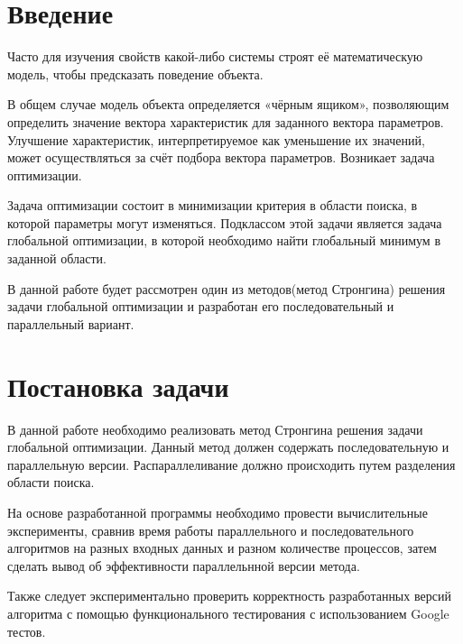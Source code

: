 \documentclass{report}
\begin{document}
	\setcounter{page}{2}
	
	\tableofcontents
	\newpage
	
	\section*{Введение}
	Часто для изучения свойств какой-либо системы строят её математическую модель, чтобы предсказать поведение объекта.
	\par
	В общем случае модель объекта определяется «чёрным ящиком», позволяющим определить значение вектора характеристик для заданного вектора параметров. Улучшение характеристик, интерпретируемое как уменьшение их значений, может осуществляться за счёт подбора вектора параметров. Возникает задача оптимизации.
	\par
	Задача оптимизации состоит в минимизации критерия в области поиска, в которой параметры могут изменяться. Подклассом этой задачи является задача глобальной оптимизации, в которой необходимо найти глобальный минимум в заданной области.
	\par
	В данной работе будет рассмотрен один из методов(метод Стронгина) решения задачи глобальной оптимизации и разработан его последовательный и параллельный вариант.
	
	\newpage
	
	\section*{Постановка задачи}
	В данной работе необходимо реализовать метод Стронгина решения задачи глобальной оптимизации. Данный метод должен содержать последовательную и параллельную версии. Распараллеливание должно происходить путем разделения области поиска.
	\par
	На основе разработанной программы необходимо провести вычислительные эксперименты, сравнив время работы параллельного и последовательного алгоритмов на разных входных данных и разном количестве процессов, затем сделать вывод об эффективности параллельнной версии метода.
	\par
	Также следует экспериментально проверить корректность разработанных версий алгоритма с помощью функционального тестирования с использованием Google тестов.
	\newpage
	
\end{document}
